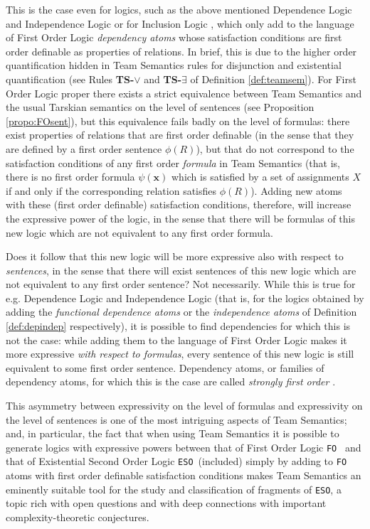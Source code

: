 \documentclass{article}
\theoremstyle{definition}
\newcommand{\tuple}{\mathbf}
\newcommand{\FO}{\texttt{FO}}
\newcommand{\ESO}{\texttt{ESO}}
\begin{document}
This is the case even for logics, such as the above mentioned Dependence Logic and Independence Logic or for Inclusion Logic \cite{galliani12}, which only add to the language of First Order Logic \emph{dependency atoms} whose satisfaction conditions are first order definable as properties of relations. In brief, this is due to the higher order quantification hidden in Team Semantics rules for disjunction and existential quantification (see Rules \textbf{TS-$\vee$} and \textbf{TS-$\exists$} of Definition \ref{def:teamsem}). For First Order Logic proper there exists a strict equivalence between Team Semantics and the usual Tarskian semantics on the level of sentences (see Proposition \ref{propo:FOsent}), but this equivalence fails badly on the level of formulas: there exist properties of relations that are first order definable (in the sense that they are defined by a first order sentence $\phi(R)$), but that do not correspond to the satisfaction conditions of any first order \emph{formula} in Team Semantics (that is, there is no first order formula $\psi(\tuple x)$ which is satisfied by a set of assignments $X$ if and only if the corresponding relation satisfies $\phi(R)$). Adding new atoms with these (first order definable) satisfaction conditions, therefore, will increase the expressive power of the logic, in the sense that there will be formulas of this new logic which are not equivalent to any first order formula. 

Does it follow that this new logic will be more expressive also with respect to \emph{sentences}, in the sense that there will exist sentences of this new logic which are not equivalent to any first order sentence? Not necessarily. While this is true for e.g. Dependence Logic and Independence Logic (that is, for the logics obtained by adding the \emph{functional dependence atoms} or the \emph{independence atoms} of Definition \ref{def:depindep} respectively), it is possible to find dependencies for which this is not the case: while adding them to the language of First Order Logic makes it more expressive \emph{with respect to formulas}, every sentence of this new logic is still equivalent to some first order sentence. Dependency atoms, or families of dependency atoms, for which this is the case are called \emph{strongly first order} \cite{galliani2015upwards,galliani2016strongly}.

This asymmetry between expressivity on the level of formulas and expressivity on the level of sentences is one of the most intriguing aspects of Team Semantics; and, in particular, the fact that when using Team Semantics it is possible to generate logics with expressive powers between that of First Order Logic \FO~ and that of Existential Second Order Logic \ESO ~(included) simply by adding to \FO~ atoms with first order definable satisfaction conditions makes Team Semantics an eminently suitable tool for the study and classification of fragments of \ESO, a topic rich with open questions and with deep connections with important complexity-theoretic conjectures. 
\end{document}
